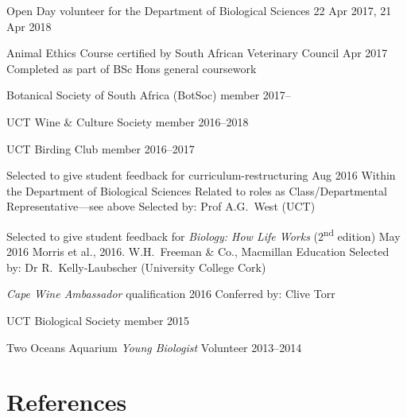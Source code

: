 \documentclass[10pt]{article}
\begin{document}
\begin{hangparas}{2em}{1}

Open Day volunteer for the Department of Biological Sciences
                                                 \hfill 22 Apr 2017, 21 Apr 2018

Animal Ethics Course certified by South African Veterinary Council
                                                          \hfill Apr 2017 \break
Completed as part of BSc Hons general coursework

Botanical Society of South Africa (BotSoc) member                  \hfill 2017--

UCT Wine \& Culture Society member                             \hfill 2016--2018

UCT Birding Club member                                        \hfill 2016--2017

Selected to give student feedback for curriculum-restructuring
                                                          \hfill Aug 2016 \break
Within the Department of Biological Sciences                              \break
Related to roles as Class/Departmental Representative---see above         \break
Selected by: Prof A.G.~West (UCT)

Selected to give student feedback for \textit{Biology: How Life Works}
(2\textsuperscript{nd} edition)                           \hfill May 2016 \break
Morris et al., 2016. W.H.~Freeman \& Co., Macmillan Education             \break
Selected by: Dr R.~Kelly-Laubscher (University College Cork)

\textit{Cape Wine Ambassador} qualification                   \hfill 2016 \break
Conferred by: Clive Torr

UCT Biological Society member                                        \hfill 2015

Two Oceans Aquarium \textit{Young Biologist} Volunteer         \hfill 2013--2014

\hfill

\end{hangparas}

\section*{References} %
\end{document}
